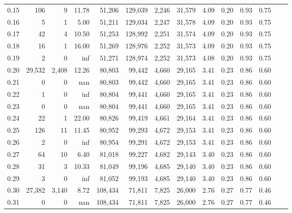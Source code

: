 \begin{tabular}{rrrrrrrrrrrrrr}
0.15 &     106 &      9 &   11.78 &   51,206 &  129,039 &   2,246 &  31,579 &  4.09 &  0.20 &  0.93 &      0.75 \\
0.16 &       5 &      1 &    5.00 &   51,211 &  129,034 &   2,247 &  31,578 &  4.09 &  0.20 &  0.93 &      0.75 \\
0.17 &      42 &      4 &   10.50 &   51,253 &  128,992 &   2,251 &  31,574 &  4.09 &  0.20 &  0.93 &      0.75 \\
0.18 &      16 &      1 &   16.00 &   51,269 &  128,976 &   2,252 &  31,573 &  4.09 &  0.20 &  0.93 &      0.75 \\
0.19 &       2 &      0 &     inf &   51,271 &  128,974 &   2,252 &  31,573 &  4.08 &  0.20 &  0.93 &      0.75 \\
0.20 &  29,532 &  2,408 &   12.26 &   80,803 &   99,442 &   4,660 &  29,165 &  3.41 &  0.23 &  0.86 &      0.60 \\
0.21 &       0 &      0 &     nan &   80,803 &   99,442 &   4,660 &  29,165 &  3.41 &  0.23 &  0.86 &      0.60 \\
0.22 &       1 &      0 &     inf &   80,804 &   99,441 &   4,660 &  29,165 &  3.41 &  0.23 &  0.86 &      0.60 \\
0.23 &       0 &      0 &     nan &   80,804 &   99,441 &   4,660 &  29,165 &  3.41 &  0.23 &  0.86 &      0.60 \\
0.24 &      22 &      1 &   22.00 &   80,826 &   99,419 &   4,661 &  29,164 &  3.41 &  0.23 &  0.86 &      0.60 \\
0.25 &     126 &     11 &   11.45 &   80,952 &   99,293 &   4,672 &  29,153 &  3.41 &  0.23 &  0.86 &      0.60 \\
0.26 &       2 &      0 &     inf &   80,954 &   99,291 &   4,672 &  29,153 &  3.41 &  0.23 &  0.86 &      0.60 \\
0.27 &      64 &     10 &    6.40 &   81,018 &   99,227 &   4,682 &  29,143 &  3.40 &  0.23 &  0.86 &      0.60 \\
0.28 &      31 &      3 &   10.33 &   81,049 &   99,196 &   4,685 &  29,140 &  3.40 &  0.23 &  0.86 &      0.60 \\
0.29 &       3 &      0 &     inf &   81,052 &   99,193 &   4,685 &  29,140 &  3.40 &  0.23 &  0.86 &      0.60 \\
0.30 &  27,382 &  3,140 &    8.72 &  108,434 &   71,811 &   7,825 &  26,000 &  2.76 &  0.27 &  0.77 &      0.46 \\
0.31 &       0 &      0 &     nan &  108,434 &   71,811 &   7,825 &  26,000 &  2.76 &  0.27 &  0.77 &      0.46 \\

\end{tabular}
